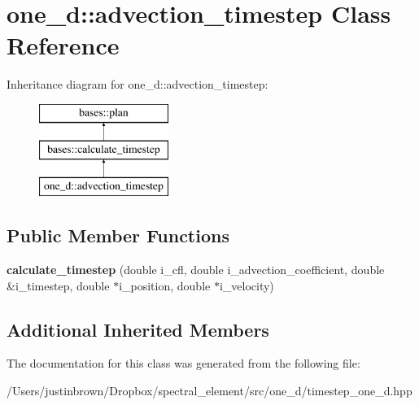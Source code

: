 \hypertarget{classone__d_1_1advection__timestep}{\section{one\-\_\-d\-:\-:advection\-\_\-timestep Class Reference}
\label{classone__d_1_1advection__timestep}
}
Inheritance diagram for one\-\_\-d\-:\-:advection\-\_\-timestep\-:\begin{figure}[H]
\begin{center}
\leavevmode
\includegraphics[height=3.000000cm]{classone__d_1_1advection__timestep}
\end{center}
\end{figure}
\subsection*{Public Member Functions}
\begin{DoxyCompactItemize}
\item 
\hypertarget{classone__d_1_1advection__timestep_aeed9f6c56f4565cc681e3bc3ccf78ed5}{{\bfseries calculate\-\_\-timestep} (double i\-\_\-cfl, double i\-\_\-advection\-\_\-coefficient, double \&i\-\_\-timestep, double $\ast$i\-\_\-position, double $\ast$i\-\_\-velocity)}\label{classone__d_1_1advection__timestep_aeed9f6c56f4565cc681e3bc3ccf78ed5}

\end{DoxyCompactItemize}
\subsection*{Additional Inherited Members}


The documentation for this class was generated from the following file\-:\begin{DoxyCompactItemize}
\item 
/\-Users/justinbrown/\-Dropbox/spectral\-\_\-element/src/one\-\_\-d/timestep\-\_\-one\-\_\-d.\-hpp\end{DoxyCompactItemize}
